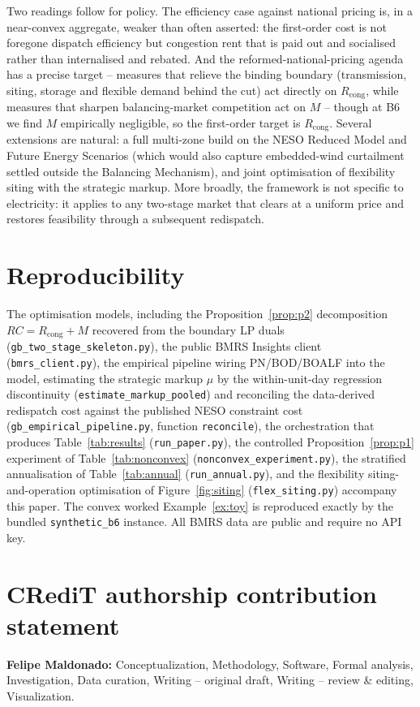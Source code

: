 \documentclass[review,3p,times]{elsarticle}
\theoremstyle{plain}
\theoremstyle{definition}
\begin{document}
Two readings follow for policy. The efficiency case against national pricing is,
in a near-convex aggregate, weaker than often asserted: the first-order cost is
not foregone dispatch efficiency but congestion rent that is paid out and
socialised rather than internalised and rebated. And the reformed-national-pricing
agenda has a precise target -- measures that relieve the binding boundary
(transmission, siting, storage and flexible demand behind the cut) act directly on
$R_{\mathrm{cong}}$, while measures that sharpen balancing-market competition act
on $M$ -- though at B6 we find $M$ empirically negligible, so the first-order
target is $R_{\mathrm{cong}}$. Several extensions are natural: a full multi-zone
build on the NESO Reduced Model and Future Energy Scenarios (which would also
capture embedded-wind curtailment settled outside the Balancing Mechanism), and joint
optimisation of flexibility siting with the strategic markup. More broadly, the
framework is not specific to electricity: it applies to any two-stage market that
clears at a uniform price and restores feasibility through a subsequent redispatch.
\section*{Reproducibility}
The optimisation models, including the Proposition~\ref{prop:p2} decomposition
$RC=R_{\mathrm{cong}}+M$ recovered from the boundary LP duals
(\texttt{gb\_two\_stage\_skeleton.py}), the public BMRS Insights client
(\texttt{bmrs\_client.py}), the empirical pipeline wiring PN/BOD/BOALF into the
model, estimating the strategic markup $\mu$ by the within-unit-day
regression discontinuity (\texttt{estimate\_markup\_pooled}) and reconciling the data-derived redispatch cost
against the published NESO constraint cost (\texttt{gb\_empirical\_pipeline.py},
function \texttt{reconcile}), the orchestration that produces
Table~\ref{tab:results} (\texttt{run\_paper.py}), the controlled
Proposition~\ref{prop:p1} experiment of Table~\ref{tab:nonconvex}
(\texttt{nonconvex\_experiment.py}), the stratified annualisation of
Table~\ref{tab:annual} (\texttt{run\_annual.py}), and the flexibility
siting-and-operation optimisation of Figure~\ref{fig:siting}
(\texttt{flex\_siting.py}) accompany this paper. The convex
worked Example~\ref{ex:toy} is reproduced exactly by the bundled
\texttt{synthetic\_b6} instance. All BMRS
data are public and require no API key.

\section*{CRediT authorship contribution statement}
\textbf{Felipe Maldonado:} Conceptualization, Methodology, Software, Formal
analysis, Investigation, Data curation, Writing -- original draft, Writing --
review \& editing, Visualization.
\end{document}
